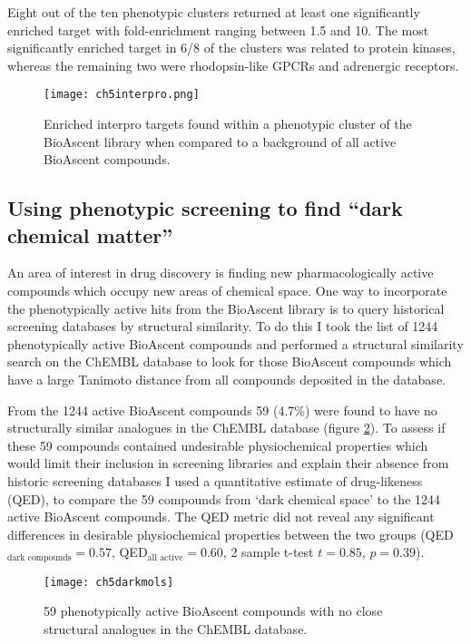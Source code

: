 \documentclass[a4paper,11pt,twoside,openright]{scrbook}
\begin{document}
Eight out of the ten phenotypic clusters returned at least one significantly enriched target with fold-enrichment 
ranging between 1.5 and 10.
The most significantly enriched target in 6/8 of the clusters was related to protein kinases, whereas the remaining two 
were rhodopsin-like GPCRs and adrenergic receptors.

\begin{figure}
    \captionsetup{width=0.8\textwidth}
    \caption[Interpro target enrichment]{
        Enriched interpro targets found within a phenotypic cluster of the BioAscent library when compared to a 
background of all active BioAscent compounds.
}
    \texttt{[image: ch5interpro.png]}
    \label{figure:interpro}
\end{figure}



\subsection{Using phenotypic screening to find ``dark chemical matter''}

An area of interest in drug discovery is finding new pharmacologically active compounds which occupy new areas of 
chemical space. \cite{Wassermann2015}
One way to incorporate the phenotypically active hits from the BioAscent library is to query historical screening 
databases by structural similarity.
To do this I took the list of 1244 phenotypically active BioAscent compounds and performed a structural similarity 
search on the ChEMBL database to look for those BioAscent compounds which have a large Tanimoto distance from all 
compounds deposited in the database.

From the 1244 active BioAscent compounds 59 (4.7\%) were found to have no structurally similar analogues in the ChEMBL 
database (figure \ref{figure:dark_mols}).
To assess if these 59 compounds contained undesirable physiochemical properties which would limit their inclusion in 
screening libraries and explain their absence from historic screening databases I used a quantitative estimate of 
drug-likeness (QED), \cite{Bickerton2012} to compare the 59 compounds from `dark chemical space' to the 1244 active 
BioAscent compounds.
The QED metric did not reveal any significant differences in desirable physiochemical properties between the two groups 
(QED$_{\text{dark compounds}} = 0.57$,  QED$_{\text{all active}} = 0.60$, 2 sample t-test $t=0.85$, $p=0.39$).


\begin{figure}
    \captionsetup{width=1.0\textwidth}
    \caption[BioAscent hits from dark chemical space]{
59 phenotypically active BioAscent compounds with no close structural analogues in the ChEMBL database.
}
    \texttt{[image: ch5darkmols]}
    \label{figure:dark_mols}
\end{figure}
\end{document}
